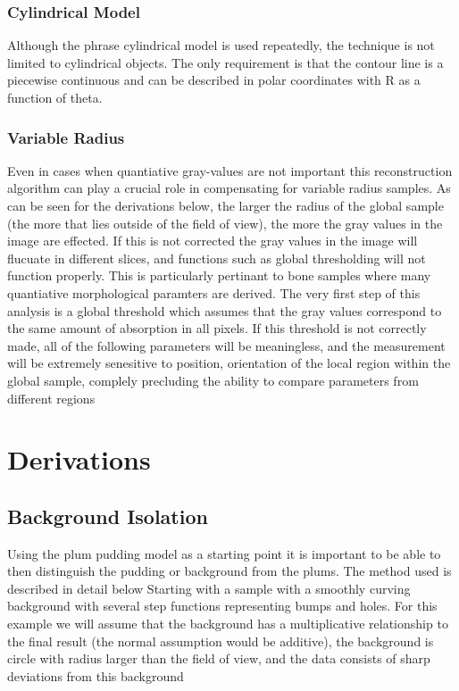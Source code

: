 \subsubsection*{Cylindrical Model}

Although the phrase cylindrical model is used repeatedly, the technique is not limited to cylindrical objects. The only requirement is that the contour line is a piecewise continuous and can be described in polar coordinates with R as a function of theta.

\subsubsection*{Variable Radius}

Even in cases when quantiative gray-values are not important this reconstruction algorithm can play a crucial role in compensating for variable radius samples. As can be seen for the derivations below, the larger the radius of the global sample (the more that lies outside of the field of view), the more the gray values in the image are effected. If this is not corrected the gray values in the image will flucuate in different slices, and functions such as global thresholding will not function properly. This is particularly pertinant to bone samples where many quantiative morphological paramters are derived. The very first step of this analysis is a global threshold which assumes that the gray values correspond to the same amount of absorption in all pixels. If this threshold is not correctly made, all of the following parameters will be meaningless, and the measurement will be extremely senesitive to position, orientation of the local region within the global sample, complely precluding the ability to compare parameters from different regions

\section*{Derivations}

\subsection*{Background Isolation}

Using the plum pudding model as a starting point it is important to be able to then distinguish the pudding or background from the plums. The method used is described in detail below Starting with a sample with a smoothly curving background with several step functions representing bumps and holes. For this example we will assume that the background has a multiplicative relationship to the final result (the normal assumption would be additive), the background is circle with radius larger than the field of view, and the data consists of sharp deviations from this background

